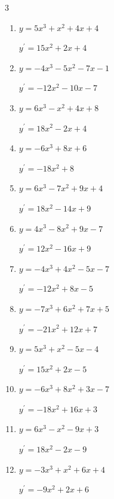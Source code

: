 \begin{multicols}{3}
\begin{enumerate}
        $\displaystyle y^{\prime}=27x^{2}+8x-6$

  \item $y=5x^{3}+x^{2}+4x+4$

        $\displaystyle y^{\prime}=15x^{2}+2x+4$

  \item $y=-4x^{3}-5x^{2}-7x-1$

        $\displaystyle y^{\prime}=-12x^{2}-10x-7$

  \item $y=6x^{3}-x^{2}+4x+8$

        $\displaystyle y^{\prime}=18x^{2}-2x+4$

  \item $y=-6x^{3}+8x+6$

        $\displaystyle y^{\prime}=-18x^{2}+8$

  \item $y=6x^{3}-7x^{2}+9x+4$

        $\displaystyle y^{\prime}=18x^{2}-14x+9$

\columnbreak %

\resetques

  \item $y=4x^{3}-8x^{2}+9x-7$

        $\displaystyle y^{\prime}=12x^{2}-16x+9$

  \item $y=-4x^{3}+4x^{2}-5x-7$

        $\displaystyle y^{\prime}=-12x^{2}+8x-5$

  \item $y=-7x^{3}+6x^{2}+7x+5$

        $\displaystyle y^{\prime}=-21x^{2}+12x+7$

  \item $y=5x^{3}+x^{2}-5x-4$

        $\displaystyle y^{\prime}=15x^{2}+2x-5$

  \item $y=-6x^{3}+8x^{2}+3x-7$

        $\displaystyle y^{\prime}=-18x^{2}+16x+3$

  \item $y=6x^{3}-x^{2}-9x+3$

        $\displaystyle y^{\prime}=18x^{2}-2x-9$

  \item $y=-3x^{3}+x^{2}+6x+4$

        $\displaystyle y^{\prime}=-9x^{2}+2x+6$


\end{enumerate}
\end{multicols}
